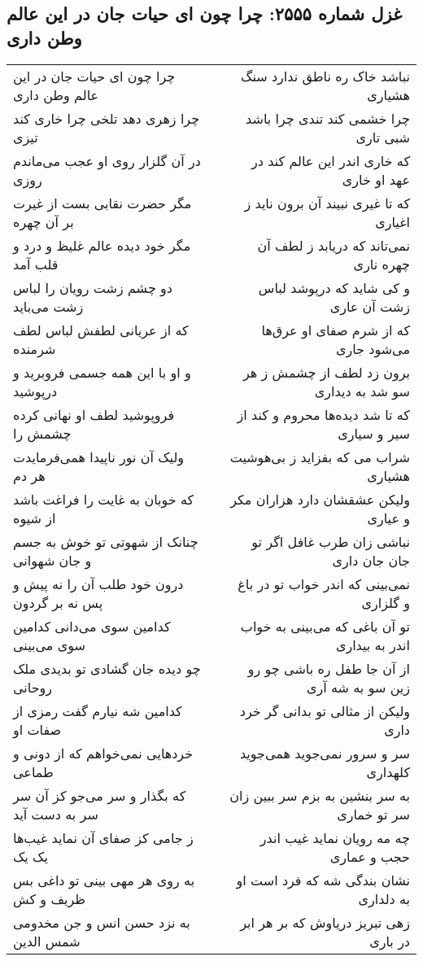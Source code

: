 \begin{center}
\section*{غزل شماره ۲۵۵۵: چرا چون ای حیات جان در این عالم وطن داری}
\label{sec:2555}
\begin{longtable}{l p{0.5cm} r}
چرا چون ای حیات جان در این عالم وطن داری
&&
نباشد خاک ره ناطق ندارد سنگ هشیاری
\\
چرا زهری دهد تلخی چرا خاری کند تیزی
&&
چرا خشمی کند تندی چرا باشد شبی تاری
\\
در آن گلزار روی او عجب می‌ماندم روزی
&&
که خاری اندر این عالم کند در عهد او خاری
\\
مگر حضرت نقابی بست از غیرت بر آن چهره
&&
که تا غیری نبیند آن برون ناید ز اغیاری
\\
مگر خود دیده عالم غلیظ و درد و قلب آمد
&&
نمی‌تاند که دریابد ز لطف آن چهره ناری
\\
دو چشم زشت رویان را لباس زشت می‌باید
&&
و کی شاید که درپوشد لباس زشت آن عاری
\\
که از عریانی لطفش لباس لطف شرمنده
&&
که از شرم صفای او عرق‌ها می‌شود جاری
\\
و او با این همه جسمی فروبرید و درپوشید
&&
برون زد لطف از چشمش ز هر سو شد به دیداری
\\
فروپوشید لطف او نهانی کرده چشمش را
&&
که تا شد دیده‌ها محروم و کند از سیر و سیاری
\\
ولیک آن نور ناپیدا همی‌فرمایدت هر دم
&&
شراب می که بفزاید ز بی‌هوشیت هشیاری
\\
که خوبان به غایت را فراغت باشد از شیوه
&&
ولیکن عشقشان دارد هزاران مکر و عیاری
\\
چنانک از شهوتی تو خوش به جسم و جان شهوانی
&&
نباشی زان طرب غافل اگر تو جان جان داری
\\
درون خود طلب آن را نه پیش و پس نه بر گردون
&&
نمی‌بینی که اندر خواب تو در باغ و گلزاری
\\
کدامین سوی می‌دانی کدامین سوی می‌بینی
&&
تو آن باغی که می‌بینی به خواب اندر به بیداری
\\
چو دیده جان گشادی تو بدیدی ملک روحانی
&&
از آن جا طفل ره باشی چو رو زین سو به شه آری
\\
کدامین شه نیارم گفت رمزی از صفات او
&&
ولیکن از مثالی تو بدانی گر خرد داری
\\
خردهایی نمی‌خواهم که از دونی و طماعی
&&
سر و سرور نمی‌جوید همی‌جوید کلهداری
\\
که بگذار و سر می‌جو کز آن سر سر به دست آید
&&
به سر بنشین به بزم سر ببین زان سر تو خماری
\\
ز جامی کز صفای آن نماید غیب‌ها یک یک
&&
چه مه رویان نماید غیب اندر حجب و عماری
\\
به روی هر مهی بینی تو داغی بس ظریف و کش
&&
نشان بندگی شه که فرد است او به دلداری
\\
به نزد حسن انس و جن مخدومی شمس الدین
&&
زهی تبریز دریاوش که بر هر ابر در باری
\\
\end{longtable}
\end{center}
